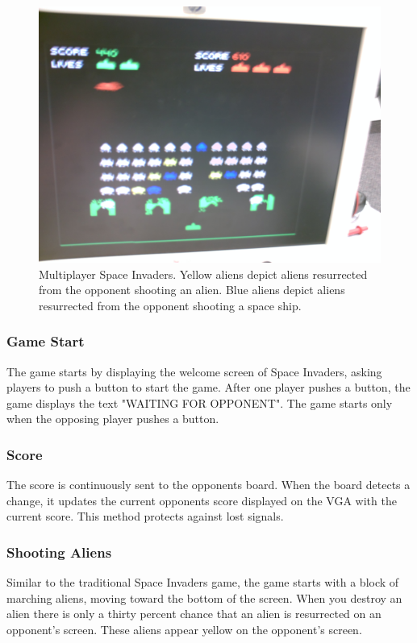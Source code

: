 \documentclass[11pt,letter,oneside]{report}
\begin{document}
\begin{figure}[H]
\centering
\includegraphics[scale=.05]{multiplayer.jpg}
\caption{Multiplayer Space Invaders. Yellow aliens depict aliens resurrected from the opponent shooting an alien. Blue aliens depict aliens resurrected from the opponent shooting a space ship.}
\label{fig:multiplayer}
\end{figure}

\subsubsection{Game Start}
The game starts by displaying the welcome screen of Space Invaders, asking players to push a button to start the game. After one player pushes a button, the game displays the text "WAITING FOR OPPONENT". The game starts only when the opposing player pushes a button.

\subsubsection{Score}
The score is continuously sent to the opponents board. When the board detects a change, it updates the current opponents score displayed on the VGA with the current score. This method protects against lost signals.

\subsubsection{Shooting Aliens}
Similar to the traditional Space Invaders game, the game starts with a block of marching aliens, moving toward the bottom of the screen. When you destroy an alien there is only a thirty percent chance that an alien is resurrected on an opponent's screen. These aliens appear yellow on the opponent's screen.
\end{document}
